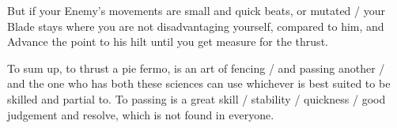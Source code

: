 But if your Enemy's movements are small and quick beats, or mutated /
your Blade stays where you are not disadvantaging yourself, compared
to him, and Advance the point to his hilt until you get measure for
the thrust.


To sum up, to thrust a pie fermo, is an art of fencing / and passing
another / and the one who has both these sciences can use whichever is
best suited to be skilled and partial to. To passing is a great skill
/ stability / quickness / good judgement and resolve, which is not
found in everyone.
